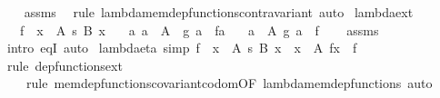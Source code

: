 \begin{isabellebody}
%
\isadelimproof
\ \ %
\endisadelimproof
%
\isatagproof
{}\isamarkupfalse%
\ assms\ \isamarkupfalse%
\ {\isacharparenleft}{\kern0pt}rule\ lambda{\isacharunderscore}{\kern0pt}mem{\isacharunderscore}{\kern0pt}dep{\isacharunderscore}{\kern0pt}functions{\isacharunderscore}{\kern0pt}contravariant{\isacharparenright}{\kern0pt}\ auto%
\endisatagproof
{\isafoldproof}%
%
\isadelimproof
\isanewline
%
\endisadelimproof
\isanewline
{}\isamarkupfalse%
\ lambda{\isacharunderscore}{\kern0pt}ext{\isacharcolon}{\kern0pt}\isanewline
\ \ \ {\isachardoublequoteopen}f\ {\isasymin}\ {\isacharparenleft}{\kern0pt}x\ {\isasymin}\ A{\isacharparenright}{\kern0pt}\ {\isasymrightarrow}s\ {\isacharparenleft}{\kern0pt}B\ x{\isacharparenright}{\kern0pt}{\isachardoublequoteclose}\isanewline
\ \ \ {\isachardoublequoteopen}{\isasymAnd}a{\isachardot}{\kern0pt}\ a\ {\isasymin}\ A\ {\isasymLongrightarrow}\ g\ a\ {\isacharequal}{\kern0pt}\ f{\isacharbackquote}{\kern0pt}a{\isachardoublequoteclose}\isanewline
\ \ \ {\isachardoublequoteopen}{\isacharparenleft}{\kern0pt}{\isasymlambda}a\ {\isasymin}\ A{\isachardot}{\kern0pt}\ g\ a{\isacharparenright}{\kern0pt}\ {\isacharequal}{\kern0pt}\ f{\isachardoublequoteclose}\isanewline
%
\isadelimproof
\ \ %
\endisadelimproof
%
\isatagproof
{}\isamarkupfalse%
\ assms\ \isamarkupfalse%
\ {\isacharparenleft}{\kern0pt}intro\ eqI{\isacharparenright}{\kern0pt}\ auto%
\endisatagproof
{\isafoldproof}%
%
\isadelimproof
\isanewline
%
\endisadelimproof
\isanewline
{}\isamarkupfalse%
\ lambda{\isacharunderscore}{\kern0pt}eta\ {\isacharbrackleft}{\kern0pt}simp{\isacharbrackright}{\kern0pt}{\isacharcolon}{\kern0pt}\ {\isachardoublequoteopen}f\ {\isasymin}\ {\isacharparenleft}{\kern0pt}x\ {\isasymin}\ A{\isacharparenright}{\kern0pt}\ {\isasymrightarrow}s\ {\isacharparenleft}{\kern0pt}B\ x{\isacharparenright}{\kern0pt}\ {\isasymLongrightarrow}\ {\isacharparenleft}{\kern0pt}{\isasymlambda}x\ {\isasymin}\ A{\isachardot}{\kern0pt}\ f{\isacharbackquote}{\kern0pt}x{\isacharparenright}{\kern0pt}\ {\isacharequal}{\kern0pt}\ f{\isachardoublequoteclose}\isanewline
%
\isadelimproof
\ \ %
\endisadelimproof
%
\isatagproof
{}\isamarkupfalse%
\ {\isacharparenleft}{\kern0pt}rule\ dep{\isacharunderscore}{\kern0pt}functions{\isacharunderscore}{\kern0pt}ext{\isacharcomma}{\kern0pt}\isanewline
\ \ \ \ rule\ mem{\isacharunderscore}{\kern0pt}dep{\isacharunderscore}{\kern0pt}functions{\isacharunderscore}{\kern0pt}covariant{\isacharunderscore}{\kern0pt}codom{\isacharbrackleft}{\kern0pt}OF\ lambda{\isacharunderscore}{\kern0pt}mem{\isacharunderscore}{\kern0pt}dep{\isacharunderscore}{\kern0pt}functions{\isacharbrackright}{\kern0pt}{\isacharparenright}{\kern0pt}\ auto%

\end{isabellebody}
